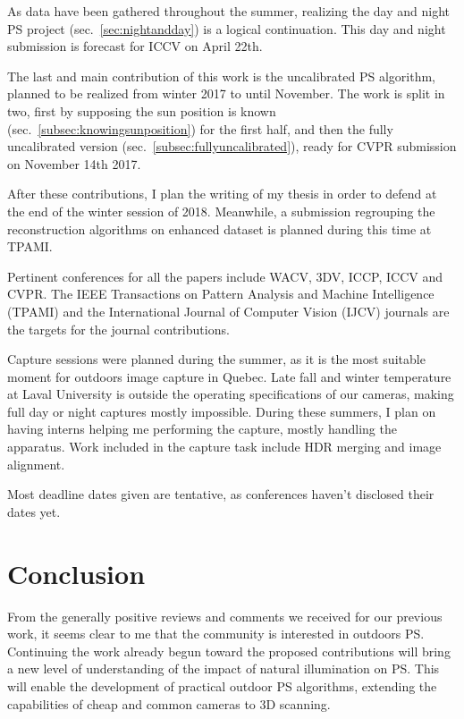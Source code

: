 \documentclass{report}
\begin{document}
As data have been gathered throughout the summer, realizing the day and night PS project (sec.~\ref{sec:nightandday}) is a logical continuation. This day and night submission is forecast for ICCV on April 22th.

The last and main contribution of this work is the uncalibrated PS algorithm, planned to be realized from winter 2017 to until November. The work is split in two, first by supposing the sun position is known (sec.~\ref{subsec:knowingsunposition}) for the first half, and then the fully uncalibrated version (sec.~\ref{subsec:fullyuncalibrated}), ready for CVPR submission on November 14th 2017.

After these contributions, I plan the writing of my thesis in order to defend at the end of the winter session of 2018. Meanwhile, a submission regrouping the reconstruction algorithms on enhanced dataset is planned during this time at TPAMI.

Pertinent conferences for all the papers include WACV, 3DV, ICCP, ICCV and CVPR. The IEEE Transactions on Pattern Analysis and Machine Intelligence (TPAMI) and the International Journal of Computer Vision (IJCV) journals are the targets for the journal contributions.

Capture sessions were planned during the summer, as it is the most suitable moment for outdoors image capture in Quebec. Late fall and winter temperature at Laval University is outside the operating specifications of our cameras, making full day or night captures mostly impossible. During these summers, I plan on having interns helping me performing the capture, mostly handling the apparatus. Work included in the capture task include HDR merging and image alignment.

Most deadline dates given are tentative, as conferences haven't disclosed their dates yet.


\chapter{Conclusion}\label{conclusion}

From the generally positive reviews and comments we received for our previous work, it seems clear to me that the community is interested in outdoors PS. Continuing the work already begun toward the proposed contributions will bring a new level of understanding of the impact of natural illumination on PS. This will enable the development of practical outdoor PS algorithms, extending the capabilities of cheap and common cameras to 3D scanning.
\end{document}
